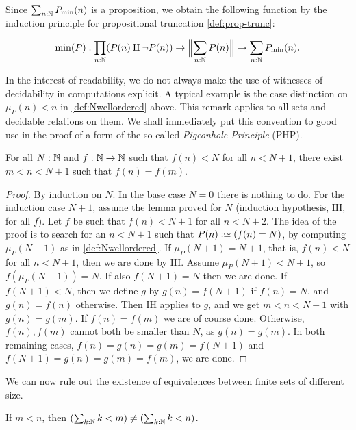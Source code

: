 \begin{definition}
Since $\sum_{n:\mathbb{N}} P_{\min}(n)$ is a proposition, 
we obtain the following function by the induction
principle for propositional truncation \cref{def:prop-trunc}:

\begin{align}\label{eqn:min}%
\min(P) : \prod_{n:\NN}(P(n)\amalg\neg P(n)) \to 
           \Trunc[\Big]{\sum_{n:\NN} P(n)} \to  \sum_{n:\NN} P_{\min}(n).
\end{align}
\end{definition}

\begin{remark}\label{rem:computations-can-decide}
In the interest of readability, we do not always make the use
of witnesses of decidability in computations explicit.
A typical example is the case distinction on $\mu_P(n) < n$ in
\cref{def:Nwellordered} above. This remark applies to all
sets and decidable relations on them. We shall immediately put
this convention to good use in the proof of a form of the so-called
\emph{Pigeonhole Principle} (PHP).
\end{remark}

\begin{lemma}\label{lem:PHP}
For all $N:\mathbb{N}$ and $f:\mathbb{N}\to\mathbb{N}$ such that $f(n)<N$
for all $n<N+1$, there exist $m < n < N+1$ such that $f(n)=f(m)$.
\end{lemma}
\begin{proof}
By induction on $N$. In the base case $N=0$ there is nothing to do.
For the induction case $N+1$, assume the lemma proved for $N$
(induction hypothesis, IH, for all $f$). Let $f$ be such 
that $f(n)<N+1$ for all $n<N+2$. The idea of the proof is
to search for an $n<N+1$ such that $P(n)\defeq (f(n)=N)$,
by computing $\mu_P(N+1)$ as in \cref{def:Nwellordered}.
If $\mu_P(N+1)=N+1$, that is, $f(n)<N$ for all $n<N+1$,
then we are done by IH. Assume $\mu_P(N+1) < N+1$,
so $f(\mu_P(N+1))=N$.
If also $f(N+1)=N$ then we are done.
If $f(N+1)<N$, then we define $g$ by $g(n)=f(N+1)$
if $f(n)= N$, and $g(n)=f(n)$ otherwise. 
Then IH applies to $g$, and we get $m < n < N+1$ with 
$g(n)=g(m)$. If $f(n)=f(m)$ we are of course done. 
Otherwise, $f(n),f(m)$ cannot both be smaller than $N$, 
as $g(n)=g(m)$. In both remaining cases, 
$f(n)=g(n)=g(m)=f(N+1)$ and $f(N+1)=g(n)=g(m)=f(m)$,
we are done.
\end{proof}

We can now rule out the existence of equivalences between finite
sets of different size.
\begin{corollary}\label{cor:Fin-n-injective}
If $m<n$, then $(\sum_{k:\mathbb{N}} k<m) \neq (\sum_{k:\mathbb{N}} k<n)$.
\end{corollary}

